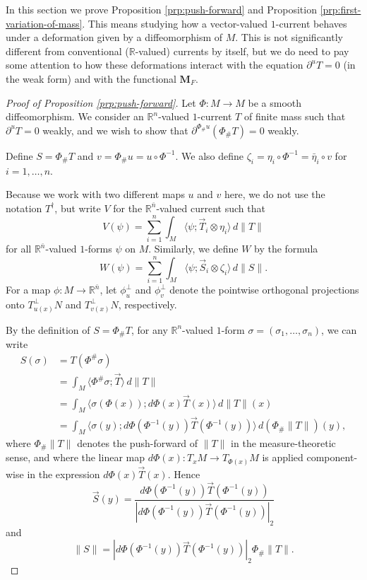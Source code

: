 \documentclass[a4paper]{article}
\newcommand{\R}{\mathbb{R}}
\newcommand{\M}{\mathbf{M}}
\newcommand{\ndim}{{\bar{n}}}
\newcommand{\pairing}[2]{\langle #1; #2 \rangle}
\theoremstyle{definition}
\theoremstyle{remark}
\begin{document}
In this section we prove Proposition \ref{prp:push-forward} and Proposition \ref{prp:first-variation-of-mass}.
This means studying how a vector-valued $1$-current
behaves under a deformation given by a diffeomorphism of $M$. This is not significantly different
from conventional ($\R$-valued) currents by itself, but we do need to pay some attention to how these deformations
interact with the equation $\partial^u T = 0$ (in the weak form) and with the functional $\M_F$.

\begin{proof}[Proof of Proposition \ref{prp:push-forward}]
Let $\Phi \colon M \to M$ be a smooth diffeomorphism.
We consider an $\R^n$-valued $1$-current $T$ of finite mass such that $\partial^u T = 0$ weakly,
and we wish to show that $\partial^{\Phi_\# u} (\Phi_\# T) = 0$ weakly.

Define $S = \Phi_\# T$ and $v = \Phi_\# u = u \circ \Phi^{- 1}$. We also define
$\zeta_i = \eta_i \circ \Phi^{-1} = \bar{\eta}_i \circ v$ for $i = 1, \dotsc, n$.

Because we work with two different maps $u$ and $v$ here, we do not use the notation $T^\dagger$, but write $V$ for the $\R^\ndim$-valued current such that
\[
V(\psi) = \sum_{i = 1}^n \int_M \pairing{\psi}{\vec{T}_i \otimes \eta_i} \, d\|T\|
\]
for all $\R^\ndim$-valued $1$-forms $\psi$ on $M$. Similarly, we define $W$ by
the formula
\[
W(\psi) = \sum_{i = 1}^n \int_M \pairing{\psi}{\vec{S}_i \otimes \zeta_i} \, d\|S\|.
\]
For a map $\phi \colon M \to \R^\ndim$, let $\phi_u^\perp$ and $\phi_v^\perp$ denote the pointwise orthogonal projections onto $T_{u(x)}^\perp N$ and
$T_{v(x)}^\perp N$, respectively.

By the definition of $S = \Phi_\# T$,
for any $\R^n$-valued $1$-form $\sigma = (\sigma_1, \dotsc, \sigma_n)$, we can write
\[
\begin{split}
S(\sigma) & = T(\Phi^\# \sigma) \\
& = \int_M \pairing{\Phi^\# \sigma}{\vec{T}} \, d\|T\| \\
& = \int_M \pairing{\sigma(\Phi(x))}{d\Phi(x) \vec{T}(x)} \, d\|T\|(x) \\
& = \int_M \pairing{\sigma(y)}{d\Phi(\Phi^{-1}(y)) \vec{T}(\Phi^{-1}(y))} \, d(\Phi_\# \|T\|)(y),
\end{split}
\]
where $\Phi_\# \|T\|$ denotes the push-forward of $\|T\|$ in the measure-theoretic sense,
and where the linear map $d\Phi(x) \colon T_x M \to T_{\Phi(x)} M$ is applied component-wise in the expression $d\Phi(x) \vec{T}(x)$.
Hence
\[
\vec{S}(y) = \frac{d\Phi(\Phi^{-1}(y)) \vec{T}(\Phi^{-1}(y))}{|d\Phi(\Phi^{-1}(y)) \vec{T}(\Phi^{-1}(y))|_2}
\]
and
\[
\|S\| = |d\Phi(\Phi^{-1}(y)) \vec{T}(\Phi^{-1}(y))|_2 \Phi_\# \|T\|.
\]


\end{proof}
\end{document}
